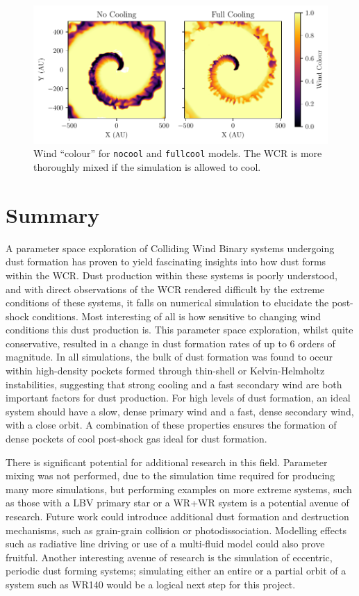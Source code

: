 \documentclass[fleqn,usenatbib]{mnras}
\begin{document}
\begin{figure}
  \centering
  \includegraphics[width=\linewidth]{assets/results/radiative/radiative-r0.pdf}
  \caption[Wind mixing due to radiative methods]{Wind ``colour'' for \texttt{nocool} and \texttt{fullcool} models. The WCR is more thoroughly mixed if the simulation is allowed to cool.}
  \label{fig:radiative-windmixing}
\end{figure}

\section{Summary}

A parameter space exploration of Colliding Wind Binary systems undergoing dust formation has proven to yield fascinating insights into how dust forms within the WCR.
Dust production within these systems is poorly understood, and with direct observations of the WCR rendered difficult by the extreme conditions of these systems, it falls on numerical simulation to elucidate the post-shock conditions.
Most interesting of all is how sensitive to changing wind conditions this dust production is.
This parameter space exploration, whilst quite conservative, resulted in a change in dust formation rates of up to 6 orders of magnitude.
In all simulations, the bulk of dust formation was found to occur within high-density pockets formed through thin-shell or Kelvin-Helmholtz instabilities, suggesting that strong cooling and a fast secondary wind are both important factors for dust production.
For high levels of dust formation, an ideal system should have a slow, dense primary wind and a fast, dense secondary wind, with a close orbit.
A combination of these properties ensures the formation of dense pockets of cool post-shock gas ideal for dust formation.

There is significant potential for additional research in this field.
Parameter mixing was not performed, due to the simulation time required for producing many more simulations, but performing examples on more extreme systems, such as those with a LBV primary star or a WR+WR system is a potential avenue of research.
Future work could introduce additional dust formation and destruction mechanisms, such as grain-grain collision or photodissociation.
Modelling effects such as radiative line driving or use of a multi-fluid model could also prove fruitful. 
Another interesting avenue of research is the simulation of eccentric, periodic dust forming systems; simulating either an entire or a partial orbit of a system such as WR140 would be a logical next step for this project.
\end{document}
